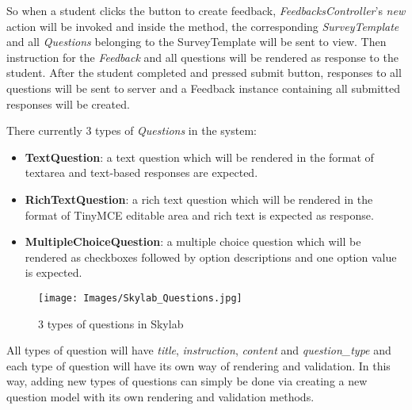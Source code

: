 So when a student clicks the button to create feedback, \textit{FeedbacksController}'s \textit{new} action will be invoked and inside the method, the corresponding \textit{SurveyTemplate} and all \textit{Questions} belonging to the SurveyTemplate will be sent to view. Then instruction for the \textit{Feedback} and all questions will be rendered as response to the student. After the student completed and pressed submit button, responses to all questions will be sent to server and a Feedback instance containing all submitted responses will be created.

There currently 3 types of \textit{Questions} in the system:

\begin{itemize}
  \item \textbf{TextQuestion}: a text question which will be rendered in the format of textarea and text-based responses are expected. 
  \item \textbf{RichTextQuestion}: a rich text question which will be rendered in the format of TinyMCE editable area and rich text is expected as response.
  \item \textbf{MultipleChoiceQuestion}: a multiple choice question which will be rendered as checkboxes followed by option descriptions and one option value is expected.
\end{itemize}

\begin{figure}[h]
    \centering
    \texttt{[image: Images/Skylab\_Questions.jpg]}
    \caption{3 types of questions in Skylab}
\end{figure}

All types of question will have \textit{title}, \textit{instruction}, \textit{content} and \textit{question\_type} and each type of question will have its own way of rendering and validation. In this way, adding new types of questions can simply be done via creating a new question model with its own rendering and validation methods.
